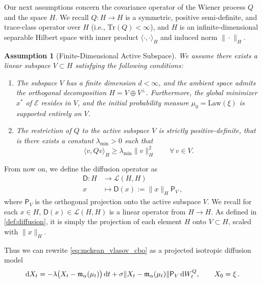 \documentclass[12pt]{amsart}
\newcommand{\D}[1]{\mbox{\rm #1}}
\newcommand{\dd}{\D{d}}
\numberwithin{equation}{section}
\newtheorem{assumption}[theorem]{Assumption}
\begin{document}
Our next assumptions concern the covariance operator  of the Wiener process $Q$ and the space $H$. 
We recall $Q:H\to H$ is a symmetric, positive semi-definite, and trace-class operator over $H$ (i.e., $\mathrm{Tr}(Q) < \infty$), and $H$ is an infinite-dimensional separable Hilbert space with inner product $\langle \cdot, \cdot \rangle_H$ and induced norm $\|\cdot\|_H$. 


\begin{assumption}[Finite-Dimensional Active Subspace] \label{assump:active_subspace}
We assume there exists a linear subspace $V \subset H$ satisfying the following conditions:

\begin{enumerate}[label=(\roman*)]
    \item 
    The subspace $V$ has a finite dimension $d < \infty$, and the ambient space admits the orthogonal decomposition $H = V \oplus V^\perp$. Furthermore, the global minimizer $x^*$ of $\mathscr{E}$ resides in $V$, and the initial probability measure $\mu_0 = \mathrm{Law}(\xi)$ is supported entirely on $V$. 
    
    \item 
    The restriction of $Q$ to the active subspace $V$ is strictly positive-definite, that is there exists a constant $\lambda_{\min} > 0$ such that
    \begin{equation*}
        \langle v, Q v \rangle_H \geq \lambda_{\min} \|v\|_H^2 \qquad \forall\,v\in V.
    \end{equation*}
\end{enumerate}
\end{assumption}


From now on, we define the diffusion operator as 
\begin{equation}\label{def:diffusion}
\begin{aligned}
    \mathsf{D}: H & \longrightarrow \mathscr{L}(H,H) \\
    x & \longmapsto \mathsf{D}(x) := \|x\|_H \mathsf{P}_V\,,
\end{aligned}
\end{equation}
where $\mathsf{P}_V$ is the orthogonal projection onto the active subspace $V$. We recall for each $x\in H$, $\mathsf{D}(x) \in \mathscr{L}(H,H)$ is a linear operator from $H\to H$. As defined in \eqref{def:diffusion}, it is simply the projection of each element $H$ onto $V\subset H$, scaled with $\|x\|_{H}$. 

Thus we can rewrite \eqref{eq:mckean_vlasov_cbo} as  a projected isotropic diffusion model
\begin{equation}
\label{eq:mckean_vlasov_cbo_P}
  \dd X_t = -\lambda \big(X_t - \mathfrak{m}_\alpha(\mu_t)\big)\,\dd t + \sigma \|X_t - \mathfrak{m}_\alpha(\mu_t)\|\mathsf{P}_V\,\dd W_t^Q, \qquad X_0 = \xi\,. 
\end{equation}
\end{document}
